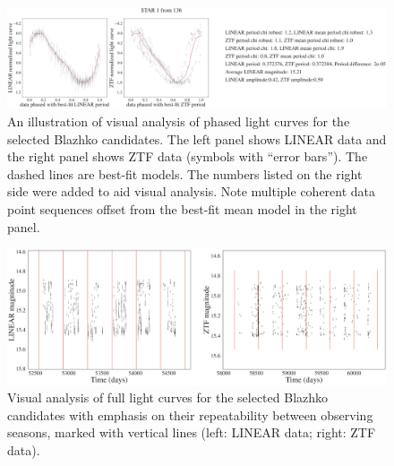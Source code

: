 \begin{figure}[ht]
  \centering
  \includegraphics[width=17cm]{LCplot_7048826.png}
  \caption{An illustration of visual analysis of phased light curves for the selected Blazhko candidates. The left
    panel shows LINEAR data and the right panel shows ZTF data (symbols with ``error bars''). The dashed
    lines are best-fit models. The numbers listed on the right side were added to aid  visual analysis. Note
    multiple coherent data point sequences offset from the best-fit mean model in the right panel.}
       \label{fig:phase1}
\end{figure}

\begin{figure}[ht] 
    \centering
       \includegraphics[width=17cm]{season_plot7048826.png}
       \caption{Visual analysis of full light curves for the selected Blazhko candidates with emphasis
         on their repeatability between observing seasons, marked with vertical lines (left: LINEAR data; right: ZTF data).}
         \label{fig:phase3}
\end{figure}
       
